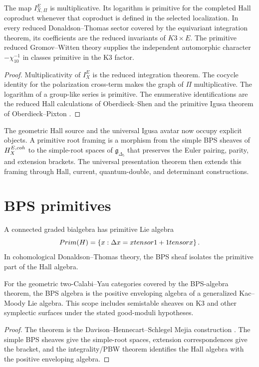 \begin{theorem}
The map $I_{X,\Pi}^E$ is multiplicative.  Its logarithm is primitive for the completed Hall coproduct whenever that coproduct is defined in the selected localization.  In every reduced Donaldson--Thomas sector covered by the equivariant integration theorem, its coefficients are the reduced invariants of $K3\times E$.  The primitive reduced Gromov--Witten theory supplies the independent automorphic character $-\chi_{10}^{-1}$ in classes primitive in the K3 factor.
\end{theorem}
\begin{proof}
Multiplicativity of $I_X^E$ is the reduced integration theorem.  The cocycle identity for the polarization cross-term makes the graph of $\Pi$ multiplicative.  The logarithm of a group-like series is primitive.  The enumerative identifications are the reduced Hall calculations of Oberdieck--Shen and the primitive Igusa theorem of Oberdieck--Pixton \cite{OberdieckShen,OP}.
\end{proof}

The geometric Hall source and the universal Igusa avatar now occupy explicit objects.  A primitive root framing is a morphism from the simple BPS sheaves of $H_X^{E,coh}$ to the simple-root spaces of $\mathfrak g_{\Delta_5}$ that preserves the Euler pairing, parity, and extension brackets.  The universal presentation theorem then extends this framing through Hall, current, quantum-double, and determinant constructions.

\chapter{BPS primitives}
A connected graded bialgebra has primitive Lie algebra
\[
 Prim(H)=\left\{x:\Delta x=xtensor1+1tensor x\right\}.
\]
In cohomological Donaldson--Thomas theory, the BPS sheaf isolates the primitive part of the Hall algebra.

\begin{theorem}
For the geometric two-Calabi--Yau categories covered by the BPS-algebra theorem, the BPS algebra is the positive enveloping algebra of a generalized Kac--Moody Lie algebra. This scope includes semistable sheaves on K3 and other symplectic surfaces under the stated good-moduli hypotheses.
\end{theorem}
\begin{proof}
The theorem is the Davison--Hennecart--Schlegel Mejia construction \cite{DHS}. The simple BPS sheaves give the simple-root spaces, extension correspondences give the bracket, and the integrality/PBW theorem identifies the Hall algebra with the positive enveloping algebra.
\end{proof}

